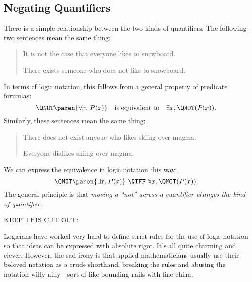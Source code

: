 \subsection{Negating Quantifiers}

There is a simple relationship between the two kinds of quantifiers.  The
following two sentences mean the same thing:
%
\begin{quote}

It is not the case that everyone likes to snowboard.

There exists someone who does not like to snowboard.

\end{quote}
%
In terms of logic notation, this follows from a general property of
predicate formulas:
%
\[
\QNOT \paren{\forall x.\; P(x)}
\quad \text{is equivalent to} \quad
\exists x.\, \QNOT(P(x)).
\]
%
Similarly, these sentences mean the same thing:
%
\begin{quote}
There does not exist anyone who likes skiing over magma.

Everyone dislikes skiing over magma.
\end{quote}
%
We can express the equivalence in logic notation this way:
%
\begin{equation}\label{nE}
\QNOT\paren{\exists x.\, P(x)}\  \QIFF\  \forall x.\, \QNOT(P(x)).
\end{equation}
%
The general principle is that \emph{moving a ``not'' across a
quantifier changes the kind of quantifier.}


\begin{editingnotes}
\begin{staffnotes}
KEEP THIS CUT OUT:
\end{staffnotes}

Logicians have worked very hard to define strict rules for the use of
logic notation so that ideas can be expressed with absolute rigor.
It's all quite charming and clever.  However, the sad irony is that
applied mathematicians usually use their beloved notation as a crude
shorthand, breaking the rules and abusing the notation
willy-nilly---sort of like pounding nails with fine china.
\end{editingnotes}

\begin{problems}

\classproblems
{}

\homeworkproblems
{}
\end{problems}




